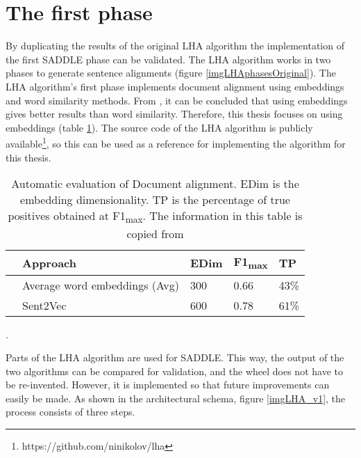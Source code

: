 \section{The first phase}
\label{secIteration1}
By duplicating the results of the original LHA algorithm the implementation of the first SADDLE phase can be validated.
 The LHA algorithm works in two phases to generate sentence alignments (figure \ref{imgLHAphasesOriginal}). The LHA algorithm's first phase implements document alignment using embeddings and word similarity methods. From \citep{nikolov2018large}, it can be concluded that using embeddings gives better results than word similarity. Therefore, this thesis focuses on using embeddings (table \ref{tabLHAPerformance}). The source code of the LHA algorithm is publicly available\footnote{https://github.com/ninikolov/lha}, so this can be used as a reference for implementing the algorithm for this thesis.\\


\begin{table}[h!tbp]
    \centering
    \captionsetup{justification=centering}
    \begin{tabular}{l|l|l|l|l}
    	& \textbf{Approach} & \textbf{EDim} & \textbf{F1}\textsubscript{max} & \textbf{TP} \\
		\hline
		\parbox[t]{2mm}{} 
		& Average word embeddings (Avg) & 300 & 0.66 & 43\% \\		
		& Sent2Vec \citet{pagliardini2017unsupervised} & 600 & 0.78 & 61\% \\	
		\hline
    \end{tabular}
    \caption{Automatic evaluation of Document alignment. EDim is the embedding dimensionality. TP is the percentage of true positives obtained at F1\textsubscript{max}. The information in this table is copied from \citet{nikolov2018large}}.
  	\label{tabLHAPerformance}
\end{table}

Parts of the LHA algorithm are used for SADDLE. This way, the output of the two algorithms can be compared for validation, and the wheel does not have to be re-invented. However, it is implemented so that future improvements can easily be made. As shown in the architectural schema, figure \ref{imgLHA_v1}, the process consists of three steps.

